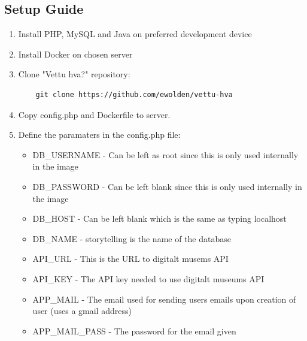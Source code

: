 \begin{appendices}
				
\subsection{Setup Guide}
\begin{enumerate}
	\item Install PHP, MySQL and Java on preferred development device
	\item Install Docker on chosen server
	\item Clone "Vettu hva?" repository:
	\begin{verbatim}
	git clone https://github.com/ewolden/vettu-hva
	\end{verbatim}
	\item Copy config.php and Dockerfile to server.
	\item Define the paramaters in the config.php file:
	\begin{itemize}
		\item DB\_USERNAME - Can be left as root since this is only used internally in the image
		\item DB\_PASSWORD - Can be left blank since this is only used internally in the image
		\item DB\_HOST - Can be left blank which is the same as typing localhost
		\item DB\_NAME - storytelling is the name of the database
		\item API\_URL - This is the URL to digitalt musems API
		\item API\_KEY - The API key needed to use digitalt museums API
		\item APP\_MAIL - The email used for sending users emails upon creation of user (uses a gmail address)
		\item APP\_MAIL\_PASS - The password for the email given
	\end{itemize}
	

\end{enumerate}
\end{appendices}
